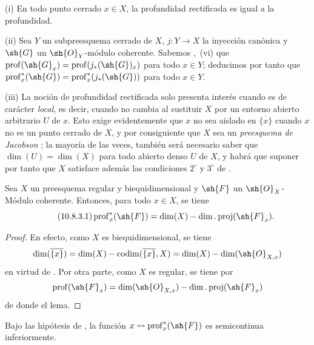 \begin{remarks}[10.8.2]
\label{IV.10.8.2}
(i) En todo punto cerrado $x\in X$, la profundidad rectificada es igual a la profundidad.

(ii) Sea $Y$ un subpreesquema cerrado de $X$, $j:Y\to X$ la inyección canónica y $\sh{G}$ un $\sh{O}_Y$-módulo coherente.
Sabemos ,~(vi) que $\operatorname{prof}(\sh{G}_x)=\operatorname{prof}(j_*(\sh{G})_x)$ para todo $x\in Y$; deducimos por tanto que $\operatorname{prof}^*_x(\sh{G})=\operatorname{prof}^*_x(j_*(\sh{G}))$ para todo $x\in Y$.

(iii) La noción de profundidad rectificada solo presenta interés cuando es de carácter \emph{local}, es decir, cuando no cambia al sustituir $X$ por un entorno abierto arbitrario $U$ de $x$.
Esto exige evidentemente que $x$ no sea aislado en $\overline{\{x\}}$ cuando $x$ no es un punto cerrado de $X$, y por consiguiente que $X$ sea un \emph{preesquema de Jacobson} ; la mayoría de las veces, también será necesario saber que $\dim(U)=\dim(X)$ para todo abierto denso $U$ de $X$, y habrá que suponer por tanto que $X$ satisface además las condiciones $2^\circ$ y $3^\circ$ de .
\end{remarks}

\begin{lemma}[10.8.3]
\label{IV.10.8.3}
Sea $X$ un preesquema regular y biequidimensional y $\sh{F}$ un $\sh{O}_X$-Módulo coherente.
Entonces, para todo $x\in X$, se tiene
\begin{equation}
\label{IV.10.8.3.1}
\tag{10.8.3.1}
\operatorname{prof}^*_x(\sh{F})=\dim(X)-\dim.\operatorname{proj}(\sh{F}_x).
\end{equation}
\end{lemma}

\begin{proof}
En efecto, como $X$ es biequidimensional, se tiene 
\[
  \dim(\overline{\{x\}})=\dim(X)-\operatorname{codim}(\overline{\{x\}},X)=\dim(X)-\dim(\sh{O}_{X,x})
\]
en virtud de .
Por otra parte, como $X$ es regular, se tiene por 
\[
  \operatorname{prof}(\sh{F}_x)=\dim(\sh{O}_{X,x})-\dim.\operatorname{proj}(\sh{F}_x)
\]
de donde el lema.
\end{proof}

\begin{corollary}[10.8.4]
\label{IV.10.8.4}
Bajo las hipótesis de , la función $x\leadsto\operatorname{prof}^*_x(\sh{F})$ es semicontinua inferiormente.
\end{corollary}

